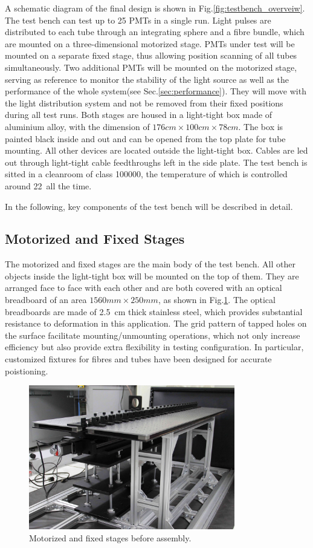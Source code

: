 \documentclass[5p, times]{elsarticle}
\begin{document}
A schematic diagram of the final design is shown in Fig.\ref{fig:testbench_overveiw}.
The test bench can test up to 25 PMTs in a single run.
Light pulses are distributed to each tube through an integrating sphere and a fibre bundle, which are mounted on a three-dimensional motorized stage.
PMTs under test will be mounted on a separate fixed stage, thus allowing position scanning of all tubes simultaneously.
Two additional PMTs will be mounted on the motorized stage, serving as reference to monitor the stability of the light source as well as the performance of the whole system(see Sec.\ref{sec:performance}).
They will move with the light distribution system and not be removed from their fixed positions during all test runs. 
Both stages are housed in a light-tight box made of aluminium alloy, with the dimension of $176cm\times100cm\times78cm$.
The box is painted black inside and out and can be opened from the top plate for tube mounting.
All other devices are located outside the light-tight box.
Cables are led out through light-tight cable feedthroughs left in the side plate.
The test bench is sitted in a cleanroom of class 100000, the temperature of which is controlled around 22\textcelsius~all the time.

In the following, key components of the test bench will be described in detail.
\subsection{Motorized and Fixed Stages}
\label{sec:stages}

The motorized and fixed stages are the main body of the test bench.
All other objects inside the light-tight box will be mounted on the top of them.
They are arranged face to face with each other and are both covered with an optical breadboard of an area $1560mm\times250mm$, as shown in Fig.\ref{fig:stages}.
The optical breadboards are made of \SI{2.5}{cm} thick stainless steel, which provides substantial resistance to deformation in this application.
The grid pattern of tapped holes on the surface facilitate mounting/unmounting operations, which not only increase efficiency but also provide extra flexibility in testing configuration.
In particular, customized fixtures for fibres and tubes have been designed for accurate poistioning.

\begin{figure}[h!]
 \centering
 \includegraphics[width=90mm]{stage1_crop}
\caption{Motorized and fixed stages before assembly.}
\label{fig:stages}
\end{figure} 
\end{document}
